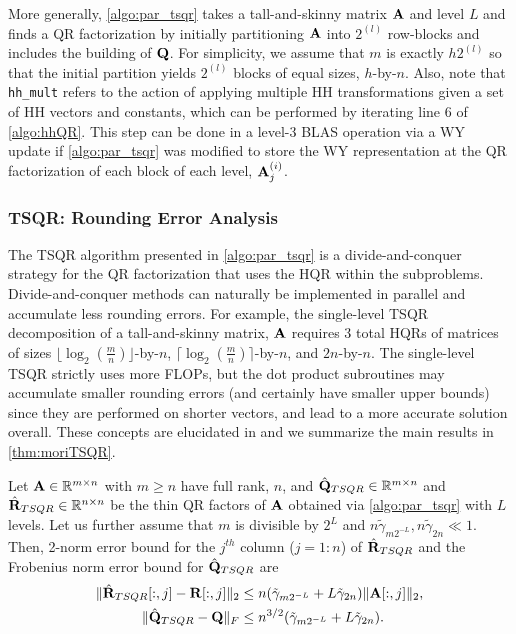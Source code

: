 More generally, \cref{algo:par_tsqr} takes a tall-and-skinny matrix $\mathbf{A}$ and level $L$ and finds a QR factorization by initially partitioning $\mathbf{A}$ into $2^{(l)}$ row-blocks and includes the building of $\mathbf{Q}$.
For simplicity, we assume that $m$ is exactly $h2^{(l)}$ so that the initial partition yields $2^{(l)}$ blocks of equal sizes, $h$-by-$n$. 
Also, note that {\tt hh\_mult} refers to the action of applying multiple HH transformations given a set of HH vectors and constants, which can be performed by iterating line 6 of \cref{algo:hhQR}.
This step can be done in a level-3 BLAS operation via a WY update if \cref{algo:par_tsqr} was modified to store the WY representation at the QR factorization of each block of each level, $\mathbf{A}_j^{(i)}$. 

\subsubsection{TSQR: Rounding Error Analysis}
\label{sec:TSQRre}
The TSQR algorithm presented in \cref{algo:par_tsqr} is a divide-and-conquer strategy for the QR factorization that uses the HQR within the subproblems. 
Divide-and-conquer methods can naturally be implemented in parallel and accumulate less rounding errors.
For example, the single-level TSQR decomposition of a tall-and-skinny matrix, $\mathbf{A}$ requires 3 total HQRs of matrices of sizes $\lfloor\log_{2}(\frac{m}{n})\rfloor$-by-$n$, $\lceil\log_{2}(\frac{m}{n})\rceil$-by-$n$, and $2n$-by-$n$.
The single-level TSQR strictly uses more FLOPs, but the dot product subroutines may accumulate smaller rounding errors (and certainly have smaller upper bounds) since they are performed on shorter vectors, and lead to a more accurate solution overall.
These concepts are elucidated in \cite{Mori2012} and we summarize the main results  in \cref{thm:moriTSQR}.

\begin{theorem}
	\label{thm:moriTSQR}
	Let $\mathbf{A}\in\mathbb{R}^{m\times n}$ with $m\geq n$ have full rank, $n$, and $\hat{\mathbf{Q}}_{TSQR}\in\mathbb{R}^{m\times n}$ and $\hat{\mathbf{R}}_{TSQR}\in\mathbb{R}^{n\times n}$ be the thin QR factors of $\mathbf{A}$ obtained via \cref{algo:par_tsqr} with $L$ levels. 
	Let us further assume that $m$ is divisible by $2^L$ and $n\tilde{\gamma}_{m2^{-L}}, n\tilde{\gamma}_{ 2n} \ll 1$.
	Then, 2-norm error bound for the $j^{th}$ column ($j=1:n$) of $\hat{\mathbf{R}}_{TSQR}$ and the Frobenius norm error bound for $\hat{\mathbf{Q}}_{TSQR}$ are
	\begin{align}
	\|\hat{\bb{R}}_{TSQR}[:,j]-\bb{R}[:,j]\|_2 &\leq n(\tilde{\gamma}_{m2^{-L}} + L\tilde{\gamma}_{ 2n})\|\bb{A}[:,j]\|_2,  \label{eqn:tsqrRA}\\
	\|\hat{\bb{Q}}_{TSQR}-\bb{Q}\|_F &\leq n^{3/2}(\tilde{\gamma}_{m2^{-L}} + L\tilde{\gamma}_{ 2n}).\label{eqn:tsqrQ}
	\end{align}
\end{theorem}

